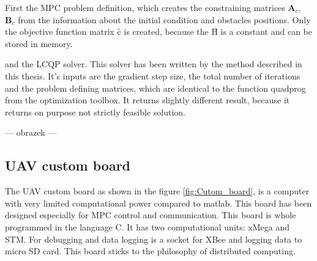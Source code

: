 \documentclass[a4paper,11pt,titlepage]{article}
\newcommand{\macHr}{\textbf{\^H}}
\newcommand{\maccr}{\textbf{\^c}}
\begin{document}
First the MPC problem definition, which creates the constraining matrices $\textbf{A}_c$, $\textbf{B}_c$ from the information about the initial condition and obstacles positions. Only the objective function matrix $\maccr$ is created, because the $\macHr$ is a constant and can be stored in memory.

 and the LCQP solver. This solver has been written by the method described in this thesis. It's inputs are the gradient step size, the total number of iterations and the problem defining matrices, which are identical to the function quadprog from the optimization toolbox. It returns slightly different result, because it returns on purpose not strictly feasible solution. 

--- obrazek ---

\subsection{UAV custom board}

The UAV custom board \cite{tom} as shown in the figure \ref{fig:Cutom_board}, is a computer with very limited computational power compared to matlab. This board has been designed \cite{tom} especially for MPC control and communication. This board is whole programmed in the language C. It has two computational units: xMega and STM. For debugging and data logging is a socket for XBee and logging data to micro SD card. This board sticks to the philosophy of distributed computing.
\end{document}
